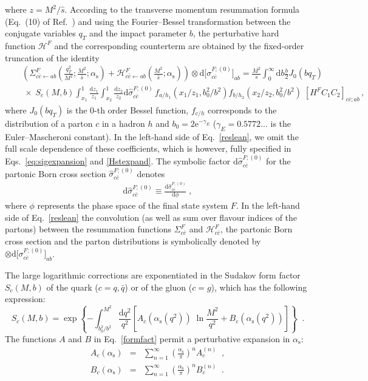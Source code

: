 \documentclass[12pt]{article}
\def\beeq{\begin{eqnarray}}
\def\eeeq{\end{eqnarray}}
\def\nn{\nonumber}
\DeclareRobustCommand{\as}{\ensuremath{\alpha_{\mathrm{s}}}}
\newcommand\f[2]{\frac{#1}{#2}}
\DeclareRobustCommand{\qt}{q_T}
\DeclareRobustCommand{\rd}{\ensuremath{\mathrm{d}}}
\begin{document}
where $z=M^{2}/\hat{s}$. According to the transverse momentum resummation formula (Eq.~(10) of Ref.~\cite{Bozzi:2005wk}) and using the Fourier--Bessel transformation between the conjugate variables $\qt$ and the impact parameter $b$, the perturbative hard function $\mathcal{H}^{F}$ and the corresponding counterterm are obtained by the fixed-order truncation of the identity
\beeq
\label{reslean}
&&\!\!\!\!\!\!\!\!\!\!\!\!\!\!\!\left( \Sigma^{F}_{c\bar{c}\leftarrow ab}\left(\f{\qt^{2}}{M^{2}};\f{M^2}{\hat s};\as\right) + \mathcal{H}^{F}_{c\bar{c}\leftarrow ab}\left(\f{M^2}{\hat s};\as\right) \right) \otimes \rd\big[\sigma^{F;(0)}_{c\bar{c}}\big]_{ab} =\f{M^{2}}{s}
\int_0^\infty \rd b \f{b}{2} J_0(b\qt)\\
&&\!\!\!\!\!\!\!\ \times  \;S_c(M,b) \int_{x_{1}}^1 \f{\rd z_1}{z_{1}} \int_{x_{2}}^1  \f{\rd z_2}{z_{2}} \rd\hat{\sigma}^{F;(0)}_{c\bar{c}} \,
 f_{a/h_1}\left(x_{1}/z_1,b_0^2/b^2\right)f_{b/h_2}\left(x_{2}/z_2,b_0^2/b^2\right)\;\left[ H^{F} C_1 C_2 \right]_{c\bar{c};ab}\,, \nn
\eeeq
where $J_0(b \qt)$ is the $0$-th order Bessel function, $f_{c/h}$ corresponds to the distribution of a parton $c$ in a hadron $h$ and $b_0=2 \mathrm{e}^{-\gamma_E}$ ($\gamma_E=0.5772...$  is the Euler--Mascheroni constant). In the left-hand side of Eq.~\eqref{reslean}, we omit the full scale dependence of these coefficients, which is however, fully specified in Eqs.~\eqref{eq:sigexpansion} and \eqref{Hstexpand}. The symbolic factor $\rd\hat{\sigma}^{F;(0)}_{c\bar{c}}$ for the partonic Born cross section $\hat{\sigma}^{F;(0)}_{c\bar{c}}$ denotes
\beeq
\rd\hat{\sigma}^{F;(0)}_{c\bar{c}}\equiv \f{\rd\hat{\sigma}^{F;(0)}_{c\bar{c}}}{\rd\phi}\;,
\eeeq 
where $\phi$ represents the phase space of the final state system $F$. In the left-hand side of Eq.~\eqref{reslean} the convolution (as well as sum over flavour indices of the partons) between the resummation functions $\Sigma^{F}_{c\bar{c}}$ and $\mathcal{H}^{F}_{c\bar{c}}$, the partonic Born cross section and the parton distributions is symbolically denoted by $\otimes \rd\big[\sigma^{F;(0)}_{c\bar{c}}\big]_{ab}$.

The large logarithmic corrections are exponentiated in the Sudakov form factor $S_c(M,b)$ of the quark  ($c=q, {\bar q}$) or of the gluon ($c=g$), which has the following  expression:
\begin{equation}
\label{formfact}
S_c(M,b) = \exp \left\{ - \int_{b_0^2/b^2}^{M^2} \frac{\rd q^2}{q^2} 
\left[ A_c(\as(q^2)) \;\ln \frac{M^2}{q^2} + B_c(\as(q^2)) \right] \right\} 
\;\;. 
\end{equation}
The functions $A$ and $B$  in Eq.~\eqref{formfact} permit a perturbative expansion in $\as$:
\beeq
\label{aexp}
A_c(\as) &=& \sum_{n=1}^\infty \left( \frac{\as}{\pi} \right)^n A_c^{(n)} 
\;\;, \\
\label{bexp}
B_c(\as) &= &\sum_{n=1}^\infty \left( \frac{\as}{\pi} \right)^n B_c^{(n)}
\;\;.
\eeeq
\end{document}

